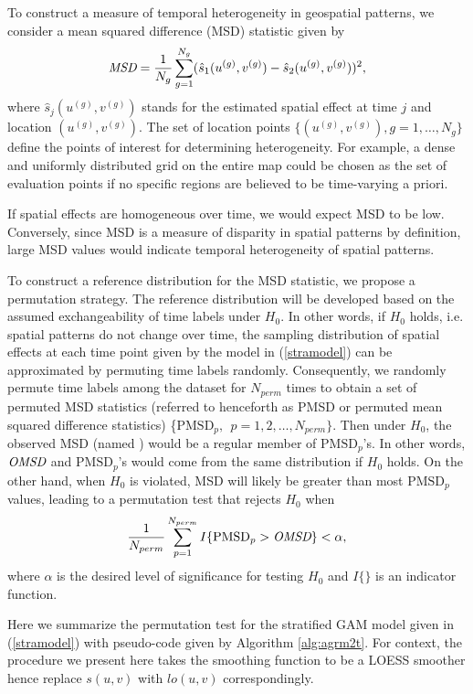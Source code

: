 	To construct a measure of temporal heterogeneity in geospatial patterns, we consider a mean squared difference (MSD) statistic given by
	\begin{equation}
	\emph{MSD}=\frac{1}{N_g}\sum_{g=1}^{N_g}(\hat{s}_{1}(u^{(g)},v^{(g)})-\hat{s}_{2}(u^{(g)},v^{(g)}))^2,
	\label{PMSD2t}
	\end{equation}
	where $\hat{s}_{j}(u^{(g)},v^{(g)})$ stands for the estimated spatial effect at time $j$ and location $(u^{(g)},v^{(g)})$. The set of location points $\{(u^{(g)},v^{(g)}),g=1,\dots,N_g\}$ define the points of interest for determining heterogeneity. For example, a dense and uniformly distributed grid on the entire map could be chosen as the set of evaluation points if no specific regions are believed to be time-varying a priori.
	
	If spatial effects are homogeneous over time, we would expect MSD to be low. Conversely, since MSD is a measure of disparity in spatial patterns by definition, large MSD values would indicate temporal heterogeneity of spatial patterns. 
	
	To construct a reference distribution for the MSD statistic, we propose a permutation strategy. The reference distribution will be developed based on the assumed exchangeability of time labels under $H_0$. In other words, if $H_0$ holds, i.e. spatial patterns do not change over time, the sampling distribution of spatial effects at each time point given by the model in (\ref{stramodel}) can be approximated by permuting time labels randomly. Consequently, we randomly permute time labels among the dataset for $N_{perm}$ times to obtain a set of permuted MSD statistics (referred to henceforth as PMSD or permuted mean squared difference statistics) \{$\text{PMSD}_{p}, ~~p=1,2,\dots, N_{perm}\}$. Then under $H_0$, the observed MSD (named ) would be a regular member of $\text{PMSD}_{p}$'s. In other words, $\emph{OMSD}$ and $\text{PMSD}_{p}$'s would come from the same distribution if $H_0$ holds. On the other hand, when $H_0$ is violated, MSD will likely be greater than most $\text{PMSD}_{p}$ values, leading to a permutation test that rejects $H_0$ when
	\begin{equation}\label{test2t}
	\frac{1}{N_{perm}}\sum_{p=1}^{N_{perm}}{I}\{\text{PMSD}_{p}>\emph{OMSD}\}<\alpha,
	\end{equation}
	where $\alpha$ is the desired level of significance for testing $H_0$ and $I\{\}$ is an indicator function. 
	
	Here we summarize the permutation test for the stratified GAM model given in (\ref{stramodel}) with pseudo-code given by Algorithm \ref{alg:agrm2t}. For context, the procedure we present here takes the smoothing function to be a LOESS smoother hence replace $s(u,v)$ with $lo(u,v)$ correspondingly.  
	
